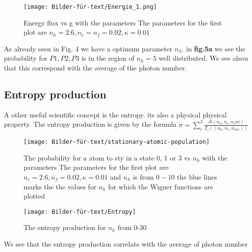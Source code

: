\documentclass[12pt,a4paper]{article}
\begin{document}
\begin{figure}[hbtp]
\centering
\texttt{[image: Bilder-für-text/Energie\_1.png]}
\caption{Energy flux vs g with the parameters The parameters for the first plot are $ n_h=2.6,n_c= n_f=0.02,\kappa=0.01 $}
\end{figure}

As already seen in Fig. 4 we have a optimum parameter $n_h$.  in \textbf{fig.5a} we see the probability for $P1,P2,P3$ is in the region of $n_h=5 $ well distributed. We see alsou that  this correspond with the average of the photon number.
\subsection{Entropy production}


A other useful scientific concept is the entropy. its also a physical physical property. 
The entropy production is given by the formula $\dot{\sigma}=\sum_i ^3 \frac{Ji(n_h,n_c,n_cav)}{T_i((n_h,n_c,n_{cav}))}$
\begin{figure}[hbtp]
\centering
\texttt{[image: Bilder-für-text/stationary-atomic-population]}
\caption{The probability for a atom to sty in a state 0, 1 or 3 vs $n_h$ with the parameters The parameters for the first plot are $n_c=2.6 ,n_f=0.02,\kappa=0.01 $ and $n_h$ is from $0-10$ the blue lines marks the the values for $ n_h$ for which the Wigner functions are plotted }
\end{figure}

\begin{figure}[hbtp]
\centering
\texttt{[image: Bilder-für-text/Entropy]}
\caption{The entropy production for $n_h$ from 0-30}
\end{figure}
\newpage
We see that the entropy production correlate with the average of photon number 
\end{document}
